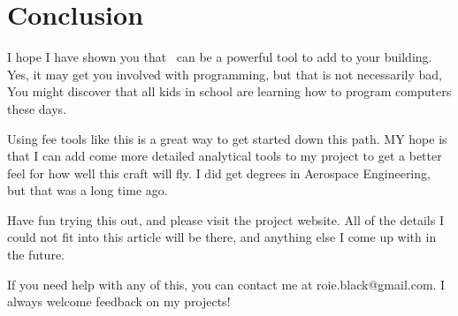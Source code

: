 \section{Conclusion}

I hope I have shown you that \osc\ can be a powerful tool to add to your
building. Yes, it may get you involved with programming, but that is not
necessarily bad, You might discover that all kids in school are learning how to
program computers these days.

Using fee tools like this is a great way to get started down this path. MY hope
is that I can add come more detailed analytical tools to my project to get a
better feel for how well this craft will fly. I did get degrees in Aerospace
Engineering, but that was a long time ago.

Have fun trying this out, and please visit the project website. All of the
details I could not fit into this article will be there, and anything else I
come up with in the future.

If you need help with any of this, you can contact me at roie.black@gmail.com.
I always welcome feedback on my projects!

